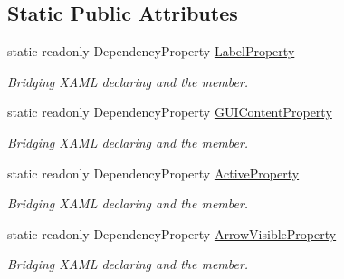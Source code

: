 \subsection*{Static Public Attributes}
\begin{DoxyCompactItemize}
\item 
static readonly Dependency\+Property \mbox{\hyperlink{class_wpf_handler_1_1_u_i_1_1_controls_1_1_header_a69d6de68c4cb8c83f31b15efbd0323dc}{Label\+Property}}
\begin{DoxyCompactList}\small\item\em Bridging X\+A\+ML declaring and the member. \end{DoxyCompactList}\item 
static readonly Dependency\+Property \mbox{\hyperlink{class_wpf_handler_1_1_u_i_1_1_controls_1_1_header_afc03b2a1c85957c525b20e793ce9cfe4}{G\+U\+I\+Content\+Property}}
\begin{DoxyCompactList}\small\item\em Bridging X\+A\+ML declaring and the member. \end{DoxyCompactList}\item 
static readonly Dependency\+Property \mbox{\hyperlink{class_wpf_handler_1_1_u_i_1_1_controls_1_1_header_a8d052187be3a68e9da2d4436bea3b504}{Active\+Property}}
\begin{DoxyCompactList}\small\item\em Bridging X\+A\+ML declaring and the member. \end{DoxyCompactList}\item 
static readonly Dependency\+Property \mbox{\hyperlink{class_wpf_handler_1_1_u_i_1_1_controls_1_1_header_aa3473a8ebaf39118c2ec51ddc0fcfce7}{Arrow\+Visible\+Property}}
\begin{DoxyCompactList}\small\item\em Bridging X\+A\+ML declaring and the member. \end{DoxyCompactList}\end{DoxyCompactItemize}
